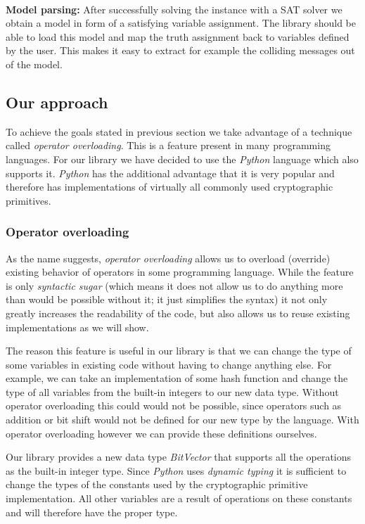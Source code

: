 ~\\
\textbf{Model parsing:}
After successfully solving the instance with a SAT solver we obtain a model in form of a satisfying variable assignment.
The library should be able to load this model and map the truth assignment back to variables defined by the user.
This makes it easy to extract for example the colliding messages out of the model.


\subsection{Our approach}
To achieve the goals stated in previous section we take advantage of a technique called \emph{operator overloading}.
This is a feature present in many programming languages.
For our library we have decided to use the \emph{Python} language which also supports it.
\emph{Python} has the additional advantage that it is very popular and therefore has implementations of virtually all commonly used cryptographic primitives.

\subsubsection{Operator overloading}
\label{sec:operator-overloading}
As the name suggests, \emph{operator overloading} allows us to overload (override) existing behavior of operators in some programming language.
While the feature is only \emph{syntactic sugar} (which means it does not allow us to do anything more than would be possible without it; it just simplifies the syntax) it not only greatly increases the readability of the code, but also allows us to reuse existing implementations as we will show.

The reason this feature is useful in our library is that we can change the type of some variables in existing code without having to change anything else.
For example, we can take an implementation of some hash function and change the type of all variables from the built-in integers to our new data type.
Without operator overloading this could would not be possible, since operators such as addition or bit shift would not be defined for our new type by the language.
With operator overloading however we can provide these definitions ourselves.

Our library provides a new data type \emph{BitVector} that supports all the operations as the built-in integer type.
Since \emph{Python} uses \emph{dynamic typing} it is sufficient to change the types of the constants used by the cryptographic primitive implementation.
All other variables are a result of operations on these constants and will therefore have the proper type.

